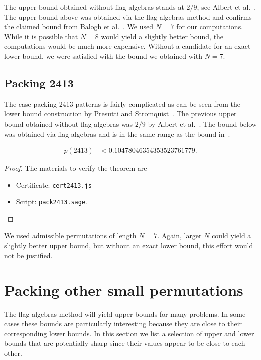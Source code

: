 \documentclass[12pt, a4paper, twoside]{report}
\begin{document}
 The upper bound obtained without flag algebras stands at $2/9$, see Albert et al.~\cite{albert2002packing}. The upper bound above was obtained via the flag algebras method and confirms the claimed bound from Balogh et al.~\cite{balogh2015minimum}. We used $N = 7$ for our computations. While it is possible that $N=8$ would yield a slightly better bound, the computations would be much more expensive. Without a candidate for an exact lower bound, we were satisfied with the bound we obtained with $N=7$.

\subsection{Packing 2413}
\label{sec:pack2413}
The case packing 2413 patterns is fairly complicated as can be seen from the lower bound construction by Presutti and Stromquist~\cite{presutti2010packing}. The previous upper bound obtained without flag algebras was $2/9$ by Albert et al.~\cite{albert2002packing}. The bound below was obtained via flag algebras and is in the same range as the bound in~\cite{balogh2015minimum}. 
\begin{theorem}
\label{thm:high2413}
\begin{align*}
p(2413) &< 0.10478046354353523761779.
\end{align*}
\end{theorem}
\begin{proof} The materials to verify the theorem are
  \begin{itemize}
    \item Certificate: \texttt{cert2413.js}
    \item Script: \texttt{pack2413.sage}.
  \end{itemize}
\end{proof}

We used admissible permutations of length $N=7$. Again, larger $N$ could yield a slightly better upper bound, but without an exact lower bound, this effort would not be justified.


\section{Packing other small permutations}
\label{sec:packingsmall}

The flag algebras method will yield upper bounds for many problems. In some cases these bounds are particularly interesting because they are close to their corresponding lower bounds. In this section we list a selection of upper and lower bounds that are potentially sharp since their values appear to be close to each other. 
\end{document}
